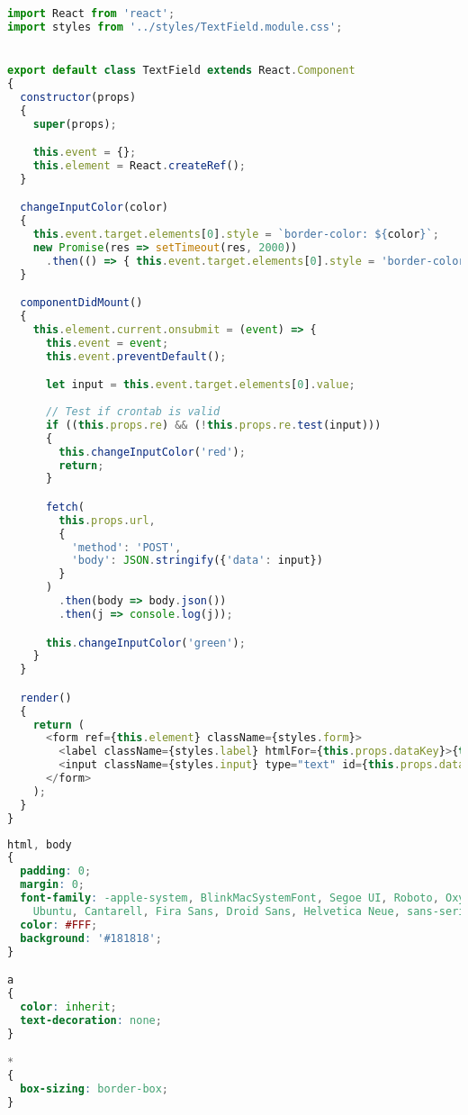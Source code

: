 \documentclass[12pt,a4paper,oneside]{book}
\begin{document}
\begin{lstlisting}[title={raspberrypi/ui/components/TextField.js}, language=JavaScript]
import React from 'react';
import styles from '../styles/TextField.module.css';


export default class TextField extends React.Component
{
  constructor(props)
  {
    super(props);

    this.event = {};
    this.element = React.createRef();
  }

  changeInputColor(color)
  {
    this.event.target.elements[0].style = `border-color: ${color}`;
    new Promise(res => setTimeout(res, 2000))
      .then(() => { this.event.target.elements[0].style = 'border-color: transperent'; });
  }

  componentDidMount()
  {
    this.element.current.onsubmit = (event) => {
      this.event = event;
      this.event.preventDefault();

      let input = this.event.target.elements[0].value;
      
      // Test if crontab is valid
      if ((this.props.re) && (!this.props.re.test(input)))
      {
        this.changeInputColor('red');
        return;
      }

      fetch(
        this.props.url,
        {
          'method': 'POST',
          'body': JSON.stringify({'data': input})
        }
      )
        .then(body => body.json())
        .then(j => console.log(j));

      this.changeInputColor('green');
    }
  }

  render()
  {
    return (
      <form ref={this.element} className={styles.form}>
        <label className={styles.label} htmlFor={this.props.dataKey}>{this.props.text}</label>
        <input className={styles.input} type="text" id={this.props.dataKey} name={this.props.dataKey} placeholder={this.props.placeHolder}/>
      </form>
    );
  }
}
\end{lstlisting}

\bigskip

\begin{lstlisting}[title={raspberrypi/ui/styles/globals.css}, language=CSS]
html, body
{
  padding: 0;
  margin: 0;
  font-family: -apple-system, BlinkMacSystemFont, Segoe UI, Roboto, Oxygen,
    Ubuntu, Cantarell, Fira Sans, Droid Sans, Helvetica Neue, sans-serif;
  color: #FFF;
  background: '#181818';
}

a
{
  color: inherit;
  text-decoration: none;
}

*
{
  box-sizing: border-box;
}
\end{lstlisting}
\end{document}
